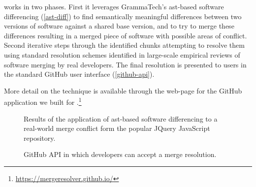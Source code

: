 \mr works in two phases.  First it leverages GrammaTech's
\gls{ast}-based software differencing (\autoref{ast-diff}) to find
semantically meaningful differences between two versions of software
against a shared base version, and to try to merge these differences
resulting in a merged piece of software with possible areas of
conflict.  Second \mr iterative steps through the identified chunks
attempting to resolve them using standard resolution schemes
identified in large-scale empirical reviews of software merging by
real developers.  The final resolution is presented to users in the
standard GitHub user interface (\autoref{github-api}).

More detail on the \mr technique is available through the web-page for
the GitHub application we built for
\mr.\footnote{\url{https://mergeresolver.github.io/}}

\begin{figure}
  \begin{center}
  \end{center}
  \caption[AST-based software differencing]{\label{ast-diff}Results of
    the application of \gls{ast}-based software differencing to a
    real-world merge conflict form the popular JQuery JavaScript
    repository.}
\end{figure}

\begin{figure}
  \begin{center}
  \end{center}
  \caption[\mr GitHub API]{\label{github-api}\mr GitHub API in which developers can
    accept a merge resolution.}  
\end{figure}
